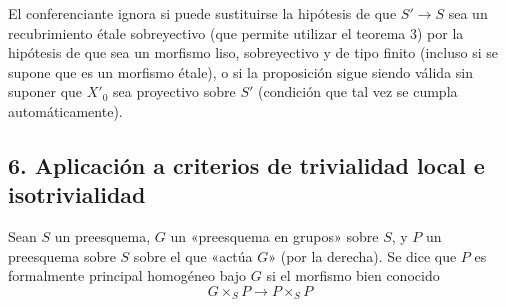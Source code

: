  El conferenciante ignora si puede sustituirse la
hipótesis de que $S'\longrightarrow S$ sea un recubrimiento étale sobreyectivo
(que permite utilizar el teorema 3) por la hipótesis de que sea un morfismo
liso, sobreyectivo y de tipo finito (incluso si se supone que es un morfismo
étale), o si la proposición sigue siendo válida sin suponer que $X'_0$ sea
proyectivo sobre $S'$ (condición que tal vez se cumpla automáticamente).

\subsection*{6. Aplicación a criterios de trivialidad local e isotrivialidad}

Sean $S$ un preesquema, $G$ un «preesquema en grupos» sobre $S$, y $P$ un
preesquema sobre $S$ sobre el que «actúa $G$» (por la derecha). Se dice que $P$
es formalmente principal homogéneo bajo $G$ si el morfismo bien conocido
\[
  G\times_SP\longrightarrow P\times_SP
\]

